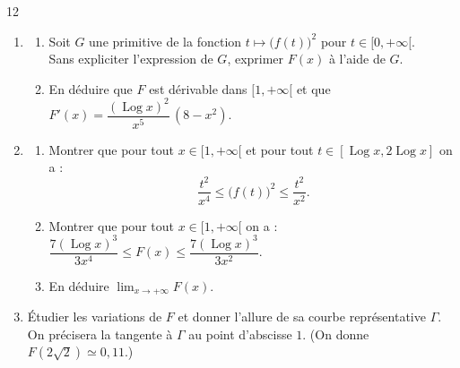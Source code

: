 \documentclass{axiobac}
\begin{document}
\begin{probleme}{12}
\begin{enumerate}
    \item
    \begin{enumerate}
        \item Soit $G$ une primitive de la fonction $t \longmapsto \big(f(t)\big)^2$ pour $t \in [0, +\infty[$. \\
        Sans expliciter l'expression de $G$, exprimer $F(x)$ à l'aide de $G$.
        \item En déduire que $F$ est dérivable dans $[1, +\infty[$ et que $F'(x) = \dfrac{(\operatorname{Log} x)^2}{x^5}\,(8 - x^2)$.
    \end{enumerate}
    \item
    \begin{enumerate}
        \item Montrer que pour tout $x \in [1, +\infty[$ et pour tout $t \in [\operatorname{Log} x, 2\operatorname{Log} x]$ on a :
        \[
        \frac{t^2}{x^4} \leqslant \big(f(t)\big)^2 \leqslant \frac{t^2}{x^2} .
        \]
        \item Montrer que pour tout $x \in [1, +\infty[$ on a : $\dfrac{7(\operatorname{Log} x)^3}{3x^4} \leqslant F(x) \leqslant \dfrac{7(\operatorname{Log} x)^3}{3x^2}$.
        \item En déduire $\displaystyle\lim_{x \to +\infty} F(x)$.
    \end{enumerate}
    \item Étudier les variations de $F$ et donner l'allure de sa courbe représentative $\Gamma$. On précisera la tangente à $\Gamma$ au point d'abscisse $1$. (On donne $F(2\sqrt{2}) \simeq 0{,}11$.)
\end{enumerate}

\end{probleme}
\end{document}
